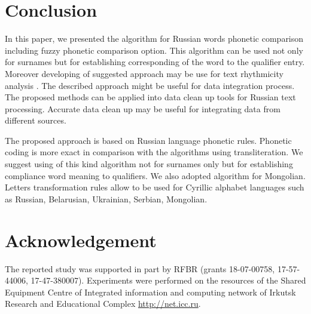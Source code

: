 \documentclass{svproc}
\begin{document}
\section{Conclusion}
In this paper, we presented the algorithm for Russian words phonetic comparison including fuzzy phonetic comparison option. This algorithm can be used not only for surnames but for establishing corresponding of the word to the qualifier entry. Moreover developing of suggested approach may be use for text rhythmicity analysis \cite{Damasevichius}. The described approach might be useful for data integration process. The proposed methods can be applied into data clean up tools for Russian text processing. Accurate data clean up may be useful for integrating data from different sources.

The proposed approach is based on Russian language phonetic rules. Phonetic coding is more exact in comparison with the algorithms using transliteration. We suggest using of this kind algorithm not for surnames only but for establishing compliance word meaning to qualifiers. We also adopted algorithm for Mongolian. Letters transformation rules allow to be used for Cyrillic alphabet languages such as Russian, Belarusian, Ukrainian, Serbian, Mongolian.



\section*{Acknowledgement}
The reported study was supported in part by RFBR (grants 18-07-00758, 17-57-44006, 17-47-380007). Experiments were performed on the resources of the Shared Equipment Centre of Integrated information and computing network of Irkutsk Research and Educational Complex \url{http://net.icc.ru}.
\end{document}
